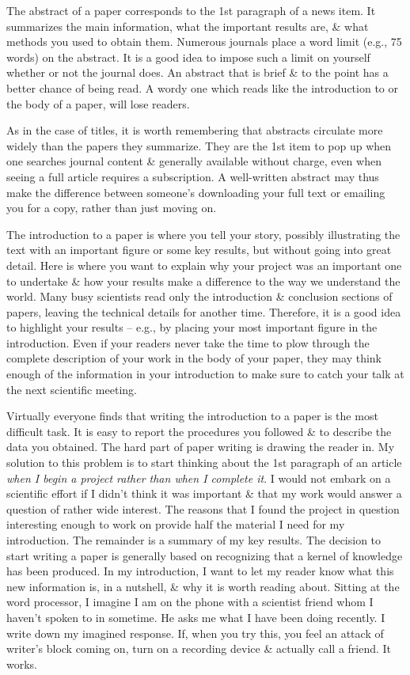 \documentclass{article}
\begin{document}
\begin{enumerate}
\begin{itemize}
\begin{itemize}
			The abstract of a paper corresponds to the 1st paragraph of a news item. It summarizes the main information, what the important results are, \& what methods you used to obtain them. Numerous journals place a word limit (e.g., 75 words) on the abstract. It is a good idea to impose such a limit on yourself whether or not the journal does. An abstract that is brief \& to the point has a better chance of being read. A wordy one which reads like the introduction to or the body of a paper, will lose readers.

			As in the case of titles, it is worth remembering that abstracts circulate more widely than the papers they summarize. They are the 1st item to pop up when one searches journal content \& generally available without charge, even when seeing a full article requires a subscription. A well-written abstract may thus make the difference between someone's downloading your full text or emailing you for a copy, rather than just moving on.

			The introduction to a paper is where you tell your story, possibly illustrating the text with an important figure or some key results, but without going into great detail. Here is where you want to explain why your project was an important one to undertake \& how your results make a difference to the way we understand the world. Many busy scientists read only the introduction \& conclusion sections of papers, leaving the technical details for another time. Therefore, it is a good idea to highlight your results -- e.g., by placing your most important figure in the introduction. Even if your readers never take the time to plow through the complete description of your work in the body of your paper, they may think enough of the information in your introduction to make sure to catch your talk at the next scientific meeting.

			Virtually everyone finds that writing the introduction to a paper is the most difficult task. It is easy to report the procedures you followed \& to describe the data you obtained. The hard part of paper writing is drawing the reader in. My solution to this problem is to start thinking about the 1st paragraph of an article \textit{when I begin a project rather than when I complete it}. I would not embark on a scientific effort if I didn't think it was important \& that my work would answer a question of rather wide interest. The reasons that I found the project in question interesting enough to work on provide half the material I need for my introduction. The remainder is a summary of my key results. The decision to start writing a paper is generally based on recognizing that a kernel of knowledge has been produced. In my introduction, I want to let my reader know what this new information is, in a nutshell, \& why it is worth reading about. Sitting at the word processor, I imagine I am on the phone with a scientist friend whom I haven't spoken to in sometime. He asks me what I have been doing recently. I write down my imagined response. If, when you try this, you feel an attack of writer's block coming on, turn on a recording device \& actually call a friend. It works.


\end{itemize}
\end{itemize}
\end{enumerate}
\end{document}
